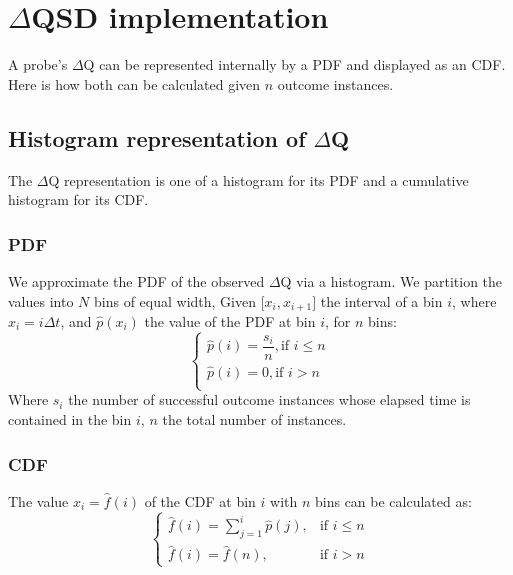\section{$\Delta$QSD implementation}
    A probe's $\Delta$Q can be represented internally by a PDF and displayed as an CDF. Here is how both can be calculated given $n$ outcome instances.
    
    \subsection{Histogram representation of $\Delta$Q}
        The $\Delta$Q representation is one of a histogram for its PDF and a cumulative histogram for its CDF.
    \subsubsection{PDF}
  We approximate the PDF of the observed $\Delta$Q via a histogram. We partition the values into $N$ bins of equal width, Given $\lbrack x_i, x_{i+1} \rbrack$ the interval of a bin $i$, where $x_i = i\Delta t$, and $\hat{p}(x_i)$ the value of the PDF at bin $i$, for $n$ bins:
        \begin{equation}
            \begin{cases}
                \hat{p}(i) = \dfrac{s_i}{n}, \text{if } i \le n \\
                \hat{p}(i) = 0, \text{if } i > n \\
            \end{cases}
            \label{eq:pdf}
        \end{equation}
    Where $s_i$ the number of successful outcome instances whose elapsed time is contained in the bin $i$, $n$ the total number of instances. \cite{stat}

    \subsubsection{CDF}
        The value $x_i = \hat{f}(i)$ of the CDF at bin $i$ with $n$ bins can be calculated as:
        \begin{equation}
            \begin{cases}
                \hat{f}(i) = \sum_{j=1}^{i} \hat{p}(j), & \text{if } i \le n \\  
                \hat{f}(i) = \hat{f}(n), & \text{if } i > n 
            \end{cases}
            \label{eq:cdf}
        \end{equation}
 
